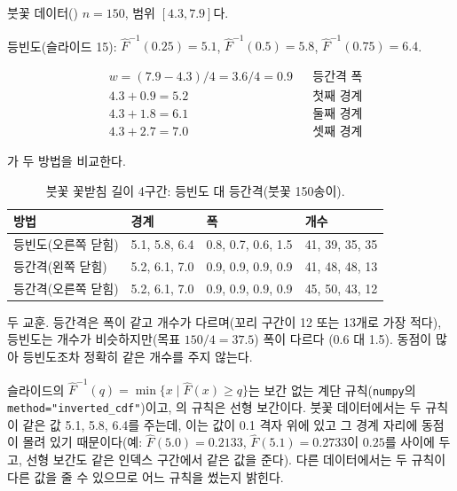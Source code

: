 \begin{example}[붓꽃 꽃받침 길이 4구간]
\label{ex:qq-iris}
붓꽃 데이터() $n=150$, 범위 $[4.3, 7.9]$다.

등빈도(슬라이드 15): $\hat F^{-1}(0.25) = 5.1$, $\hat F^{-1}(0.5) = 5.8$,
$\hat F^{-1}(0.75) = 6.4$.

\begin{align*}
  &w = (7.9 - 4.3)/4 = 3.6/4 = 0.9 && \text{등간격 폭}\\
  &4.3 + 0.9 = 5.2 && \text{첫째 경계}\\
  &4.3 + 1.8 = 6.1 && \text{둘째 경계}\\
  &4.3 + 2.7 = 7.0 && \text{셋째 경계}
\end{align*}

가 두 방법을 비교한다.

\begin{table}[H]\centering
\begin{tabularx}{\linewidth}{@{}l X X X@{}}
\toprule
방법 & 경계 & 폭 & 개수 \\
\midrule
등빈도(오른쪽 닫힘) & 5.1, 5.8, 6.4 & 0.8, 0.7, 0.6, 1.5 & 41, 39, 35, 35 \\
\midrule
등간격(왼쪽 닫힘)   & 5.2, 6.1, 7.0 & 0.9, 0.9, 0.9, 0.9 & 41, 48, 48, 13 \\
\midrule
등간격(오른쪽 닫힘) & 5.2, 6.1, 7.0 & 0.9, 0.9, 0.9, 0.9 & 45, 50, 43, 12 \\
\bottomrule
\end{tabularx}
\caption{붓꽃 꽃받침 길이 4구간: 등빈도 대 등간격(붓꽃 150송이).}
\label{tab:qq-iris-bins}
\end{table}

두 교훈. 등간격은 폭이 같고 개수가 다르며(꼬리 구간이 12 또는 13개로
가장 적다), 등빈도는 개수가 비슷하지만(목표 $150/4=37.5$) 폭이 다르다
(0.6 대 1.5). 동점이 많아 등빈도조차 정확히 같은 개수를 주지 않는다.
\end{example}

\begin{pitfall}[두 가지 ``분위수'']
슬라이드의 $\hat F^{-1}(q) = \min\{x \mid \hat F(x) \ge q\}$는 보간 없는
계단 규칙(\texttt{numpy}의 \texttt{method="inverted\_cdf"})이고,
의 규칙은 선형 보간이다. 붓꽃 데이터에서는 두 규칙이
같은 값 5.1, 5.8, 6.4를 주는데, 이는 값이 0.1 격자 위에 있고 그 경계
자리에 동점이 몰려 있기 때문이다(예: $\hat F(5.0)=0.2133$, $\hat
F(5.1)=0.2733$이 $0.25$를 사이에 두고, 선형 보간도 같은 인덱스 구간에서
같은 값을 준다). 다른 데이터에서는 두 규칙이 다른 값을 줄 수 있으므로
어느 규칙을 썼는지 밝힌다.
\end{pitfall}

